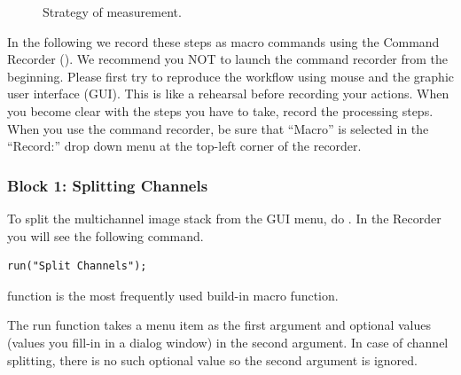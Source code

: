\begin{figure}[h!]
 \quad
 \caption{Strategy of measurement.}
 \label{fig:nucsegProc}
\end{figure}


In the following we record these steps as macro commands using the Command Recorder (). We recommend you NOT to launch the command recorder from the beginning. Please first try to reproduce the workflow using mouse and the graphic user interface (GUI). This is like a rehearsal before recording your actions. When you become clear with the steps you have to take, record the processing steps. When you use the command recorder, be sure that ``Macro'' is selected in the ``Record:'' drop down menu at the top-left corner of the recorder.

\subsubsection{Block 1: Splitting Channels}

To split the multichannel image stack from the GUI menu, do . In the Recorder you will see the following command. 
\begin{lstlisting}[numbers=none]
run("Split Channels");
\end{lstlisting}

 function is the most frequently used build-in macro function. 


The run function takes a menu item as the first argument and optional values (values you fill-in in a dialog window) in the second argument. In case of channel splitting, there is no such optional value so the second argument is ignored. 

